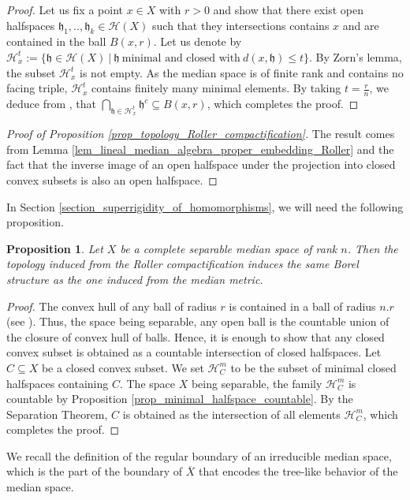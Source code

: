 \documentclass{amsart}
\numberwithin{equation}{section}
\newtheorem{prop}[thm]{Proposition}
\newcommand{\HH}{\mathcal{H}}     %
\newcommand{\hh}{\mathfrak{h}}    %
\theoremstyle{definition}
\def\bar{\overline}
\begin{document}
\begin{proof}
    Let us fix a point $x\in X$ with $r>0$ and show that there exist open halfspaces $\hh_1,..,\hh_k\in \HH(X)$ such that they intersections contains $x$ and are contained in the ball $B(x,r)$. Let us denote by $\HH_x^t:=\{\hh\in\HH(X)\ | \ \hh\ \text{minimal and closed with} \ d(x,\hh)\leq t\}$. By Zorn's lemma, the subset $\HH_x^t$ is not empty. As the median space is of finite rank and contains no facing triple, $\HH_x^t$ contains finitely many minimal elements. By taking $t=\frac{r}{n}$, we deduce from \cite[Lemma 3.7]{Messaci}, that $\displaystyle{\bigcap_{\hh\in\HH_x^t}\hh^c}\subseteq B(x,r)$, which completes the proof.
\end{proof}
\begin{proof}[Proof of Proposition \ref{prop_topology_Roller_compactification}]
    The result comes from Lemma \ref{lem_lineal_median_algebra_proper_embedding_Roller} and the fact that the inverse image of an open halfspace under the projection into closed convex subsets is also an open halfspace.
\end{proof}
In Section \ref{section_superrigidity_of_homomorphisms}, we will need the following proposition.
\begin{prop}\label{prop_Borel_structure_Roller}
    Let $X$ be a complete separable median space of rank $n$. Then the topology induced from the Roller compactification induces the same Borel structure as the one induced from the median metric.
\end{prop}
\begin{proof}
    The convex hull of any ball of radius $r$ is contained in a ball of radius $n.r$ (see \cite[Proposition 3.6]{Messaci}). Thus, the space being separable, any open ball is the countable union of the closure of convex hull of balls. Hence, it is enough to show that any closed convex subset is obtained as a countable intersection of closed halfspaces. 
 Let $C\subseteq X$ be a closed convex subset. We set $\HH_C^m$ to be the subset of minimal closed halfspaces containing $C$. The space $X$ being separable, the family $\HH_C^m$ is countable by Proposition \ref{prop_minimal_halfspace_countable}. By the Separation Theorem, $C$ is obtained as the intersection of all elements $\HH_C^m$, which completes the proof. 
\end{proof}
We recall the definition of the regular boundary of an irreducible median space, which is the part of the boundary of $\bar{X}$ that encodes the tree-like behavior of the median space.
\end{document}
